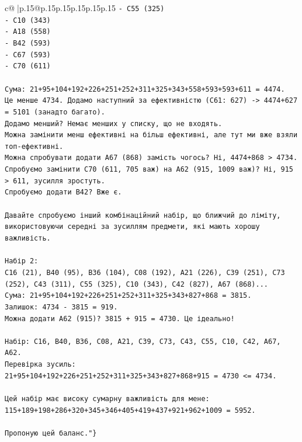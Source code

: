\documentclass{article}
\begin{document}
{\begin{supertabular}{c@{$\;$}|p{.15\linewidth}@{}p{.15\linewidth}p{.15\linewidth}p{.15\linewidth}p{.15\linewidth}p{.15\linewidth}}
{{{\texttt{{-} C55 (325)} \\
\texttt{{-} C10 (343)} \\
\texttt{{-} A18 (558)} \\
\texttt{{-} B42 (593)} \\
\texttt{{-} C67 (593)} \\
\texttt{{-} C70 (611)} \\
\\ 
\texttt{Сума: 21+95+104+192+226+251+252+311+325+343+558+593+593+611 = 4474.} \\
\texttt{Це менше 4734. Додамо наступний за ефективністю (C61: 627) {-}> 4474+627 = 5101 (занадто багато).} \\
\texttt{Додамо менший? Немає менших у списку, що не входять.} \\
\texttt{Можна замінити менш ефективні на більш ефективні, але тут ми вже взяли топ{-}ефективні.} \\
\texttt{Можна спробувати додати A67 (868) замість чогось? Ні, 4474+868 > 4734.} \\
\texttt{Спробуємо замінити C70 (611, 705 важ) на A62 (915, 1009 важ)? Ні, 915 > 611, зусилля зростуть.} \\
\texttt{Спробуємо додати B42? Вже є.} \\
\\ 
\texttt{Давайте спробуємо інший комбінаційний набір, що ближчий до ліміту, використовуючи середні за зусиллям предмети, які мають хорошу важливість.} \\
\\ 
\texttt{Набір 2:} \\
\texttt{C16 (21), B40 (95), B36 (104), C08 (192), A21 (226), C39 (251), C73 (252), C43 (311), C55 (325), C10 (343), C42 (827), A67 (868)...} \\
\texttt{Сума: 21+95+104+192+226+251+252+311+325+343+827+868 = 3815.} \\
\texttt{Залишок: 4734 {-} 3815 = 919.} \\
\texttt{Можна додати A62 (915)? 3815 + 915 = 4730. Це ідеально!} \\
\\ 
\texttt{Набір: C16, B40, B36, C08, A21, C39, C73, C43, C55, C10, C42, A67, A62.} \\
\texttt{Перевірка зусиль:} \\
\texttt{21+95+104+192+226+251+252+311+325+343+827+868+915 = 4730 <= 4734.} \\
\\ 
\texttt{Цей набір має високу сумарну важливість для мене:} \\
\texttt{115+189+198+286+320+345+346+405+419+437+921+962+1009 = 5952.} \\
\\ 
\texttt{Пропоную цей баланс."\}} \\
            }
        }
    }
     \\ \\


\end{supertabular}}
\end{document}
